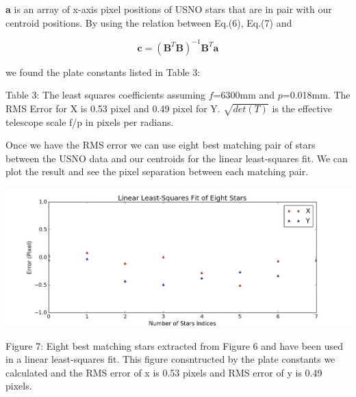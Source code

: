 \documentclass[onecolumn, 12pt, a4paper]{article}
\begin{document}
\leavevmode
\newline
\newline
\textbf{a} is an array of x-axis pixel positions of USNO stars that are in pair with our centroid positions. By using the relation between Eq.(6), Eq.(7) and 

\begin{equation}
\textbf{c} = (\textbf{B}^{T}\textbf{B})^{-1}\textbf{B}^{T}\textbf{a}
\end{equation}

\leavevmode
\newline
we found the plate constants listed in Table 3:
\newline

\leavevmode
\newline
\newline
\newline
Table 3: The least squares coefficients assuming $f$=6300mm and $p$=0.018mm. The RMS Error for X is 0.53 pixel and 0.49 pixel for Y. $\sqrt{det(T)}$ is the effective telescope scale f/p in pixels per radians.\newline

Once we have the RMS error we can use eight best matching pair of stars between the USNO data and our centroids for the linear least-squares fit. We can plot the result and see the pixel separation between each matching pair.


\centerline{\includegraphics[scale=.5]{figure_1-8.png}}
\leavevmode
\newline
Figure 7: Eight best matching stars extracted from Figure 6 and have been used in a linear least-squares fit. This figure consntructed by the plate constants we calculated and the RMS error of x is 0.53 pixels and RMS error of y is 0.49 pixels. 
\end{document}
